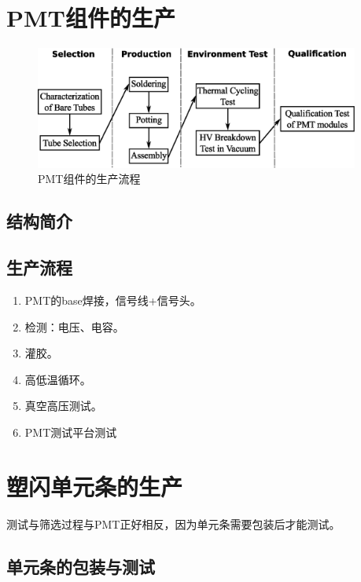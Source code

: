 \section{PMT组件的生产}
\label{sec:construction:pmt_production}

\begin{figure}[htbp]
	\centering
	\includegraphics[width=0.95\textwidth]{chap/construction/fig/pmt_production_procedure.eps}
	\caption{PMT组件的生产流程}
	\label{fig:construction:pmt_production_procedure}
\end{figure}

\subsection{结构简介}
\label{sec:construction:pmt_assembly}

\subsection{生产流程}
\label{sec:construction:pmt_procedure}
\begin{enumerate}
	\item PMT的base焊接，信号线+信号头。
	\item 检测：电压、电容。
	\item 灌胶。
	\item 高低温循环。
	\item 真空高压测试。
	\item PMT测试平台测试
\end{enumerate}

\section{塑闪单元条的生产}
\label{sec:construction:bar_production}
测试与筛选过程与PMT正好相反，因为单元条需要包装后才能测试。

\subsection{单元条的包装与测试}
\label{sec:construction:bar_wrapping_and_test}

